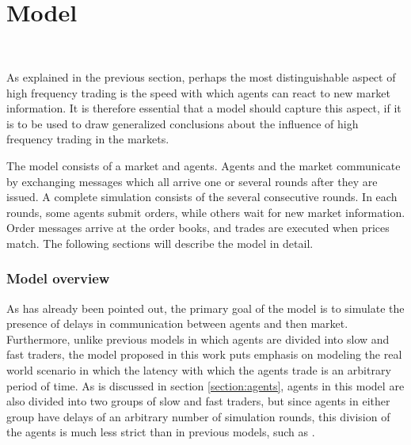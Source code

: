 \newpage
\part{Model} %

\label{chapter:model} %
$\frac{}{}$
	


As explained in the previous section, perhaps the most distinguishable aspect of high frequency trading is the speed with which agents can react to new market information. It is therefore essential that a model should capture this aspect, if it is to be used to draw generalized conclusions about the influence of high frequency trading in the markets.

The model consists of a market and agents. Agents and the market communicate by exchanging messages which all arrive one or several rounds after they are issued. A complete simulation consists of the several consecutive rounds. In each rounds, some agents submit orders, while others wait for new market information. Order messages arrive at the order books, and trades are executed when prices match.  The following sections will describe the model in detail.



\section{Model overview}

As has already been pointed out, the primary goal of the model is to simulate the presence of delays in communication between agents and then market. Furthermore, unlike previous models in which agents are divided into slow and fast traders, the model proposed in this work puts emphasis on modeling the real world scenario in which the latency with which the agents trade is an arbitrary period of time. As is discussed in section \ref{section:agents}, agents in this model are also divided into two groups of slow and fast traders, but since agents in either group have delays of an arbitrary number of simulation rounds, this division of the agents is much less strict than in previous models, such as \cite{mcinish2012strategic, hoffmann2012dynamic, foucault2012news}.

